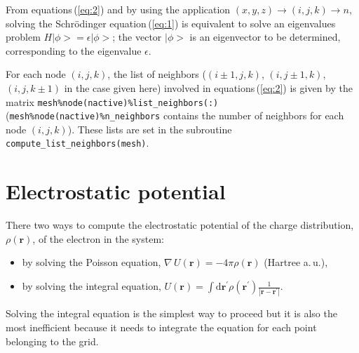 \documentclass[11pt,a4paper]{article}
\begin{document}
From equations\,(\ref{eq:2}) and by using the application $  (x,y,z)\rightarrow (i,j,k)    \rightarrow  n$, solving the Schr\"odinger equation\,(\ref{eq:1}) is equivalent to solve an eigenvalues problem $H|\phi>=\epsilon|\phi>$; the vector $|\phi>$ is an eigenvector to be determined, corresponding to the eigenvalue $\epsilon$.

For each node $(i,j,k)$, the list of neighbors ($(i\pm1,j,k)$, $(i,j\pm 1,k)$, $(i,j,k\pm 1)$ in the case given here)  involved in equations\,(\ref{eq:2}) is given by the matrix \verb+mesh%node(nactive)%list_neighbors(:)+ \\ (\verb+mesh%node(nactive)%n_neighbors+ contains the number of neighbors for each node $(i,j,k)$).
These lists are set in the   subroutine \verb+compute_list_neighbors(mesh)+.



\section{Electrostatic potential}

There two ways to compute the electrostatic potential of the charge distribution, $\rho(\bm{r})$, of the electron in the system:
\begin{itemize}
\item by solving the Poisson equation, $\nabla\,U(\bm{r})=-4\pi\rho(\bm{r})$ (Hartree a.\,u.),
\item by solving the integral equation, $U(\bm{r})=\int\mathrm{d}\bm{r}^\prime\rho(\bm{r}^\prime)\frac{1}{|\bm{r}-\bm{r}^\prime|}$.
\end{itemize}
Solving the integral equation is the simplest way to proceed but it is also the most inefficient because it needs to integrate the equation for each point belonging to the grid.
\end{document}
